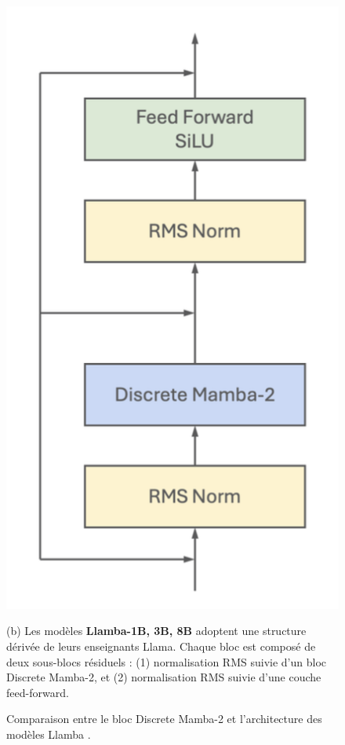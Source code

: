 \begin{figure}[H]
\begin{minipage}{0.45\textwidth}
        \includegraphics[width=\linewidth]{images/llamba_block.png}
        \caption*{\justifying \small (b) Les modèles \textbf{Llamba-1B, 3B, 8B} adoptent une structure dérivée de leurs enseignants Llama. Chaque bloc est composé de deux sous-blocs résiduels : (1) normalisation RMS suivie d’un bloc Discrete Mamba-2, et (2) normalisation RMS suivie d’une couche feed-forward.}
    \end{minipage}
    \caption{Comparaison entre le bloc Discrete Mamba-2 et l’architecture des modèles Llamba \citep{bick2025llamba}.}
    \label{fig:llamba-bloc}
\end{figure}


